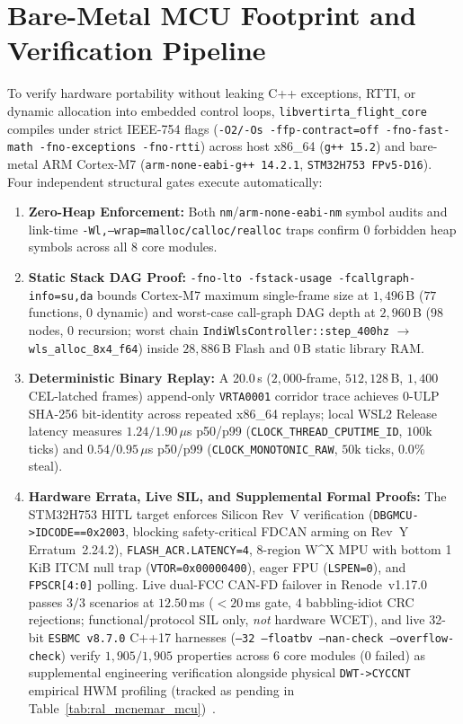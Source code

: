 \documentclass[letterpaper, 10 pt, journal, twoside]{IEEEtran}
\begin{document}
\section{Bare-Metal MCU Footprint and Verification Pipeline}
\label{sec:mcu_formal}

To verify hardware portability without leaking C++ exceptions, RTTI, or dynamic allocation into embedded control loops, \texttt{libvertirta\_flight\_core} compiles under strict IEEE-754 flags (\texttt{-O2/-Os -ffp-contract=off -fno-fast-math -fno-exceptions -fno-rtti}) across host x86\_64 (\texttt{g++ 15.2}) and bare-metal ARM Cortex-M7 (\texttt{arm-none-eabi-g++ 14.2.1}, \texttt{STM32H753 FPv5-D16}). Four independent structural gates execute automatically:
\begin{enumerate}
  \item \textbf{Zero-Heap Enforcement:} Both \texttt{nm}/\texttt{arm-none-eabi-nm} symbol audits and link-time \texttt{-Wl,--wrap=malloc/calloc/realloc} traps confirm $0$ forbidden heap symbols across all 8 core modules.
  \item \textbf{Static Stack DAG Proof:} \texttt{-fno-lto -fstack-usage -fcallgraph-info=su,da} bounds Cortex-M7 maximum single-frame size at $1{,}496$\,B ($77$ functions, $0$ dynamic) and worst-case call-graph DAG depth at $2{,}960$\,B ($98$ nodes, $0$ recursion; worst chain \texttt{IndiWlsController::step\_400hz} $\to$ \texttt{wls\_alloc\_8x4\_f64}) inside $28{,}886$\,B Flash and $0$\,B static library RAM.
  \item \textbf{Deterministic Binary Replay:} A 20.0\,s ($2{,}000$-frame, $512{,}128$\,B, $1{,}400$ CEL-latched frames) append-only \texttt{VRTA0001} corridor trace achieves 0-ULP SHA-256 bit-identity across repeated x86\_64 replays; local WSL2 Release latency measures $1.24/1.90\,\mu$s p50/p99 (\texttt{CLOCK\_THREAD\_CPUTIME\_ID}, $100\text{k}$ ticks) and $0.54/0.95\,\mu$s p50/p99 (\texttt{CLOCK\_MONOTONIC\_RAW}, $50\text{k}$ ticks, $0.0\%$ steal).
  \item \textbf{Hardware Errata, Live SIL, and Supplemental Formal Proofs:} The STM32H753 HITL target enforces Silicon Rev~V verification (\texttt{DBGMCU->IDCODE==0x2003}, blocking safety-critical FDCAN arming on Rev~Y Erratum~2.24.2), \texttt{FLASH\_ACR.LATENCY=4}, 8-region W\^{}X MPU with bottom 1\,KiB ITCM null trap (\texttt{VTOR=0x00000400}), eager FPU (\texttt{LSPEN=0}), and \texttt{FPSCR[4:0]} polling. Live dual-FCC CAN-FD failover in Renode~v1.17.0 passes $3/3$ scenarios at $12.50$\,ms ($<20$\,ms gate, $4$ babbling-idiot CRC rejections; functional/protocol SIL only, \emph{not} hardware WCET), and live 32-bit \texttt{ESBMC v8.7.0} C++17 harnesses (\texttt{--32 --floatbv --nan-check --overflow-check}) verify $1{,}905/1{,}905$ properties across $6$ core modules ($0$ failed) as supplemental engineering verification alongside physical \texttt{DWT->CYCCNT} empirical HWM profiling (tracked as pending in Table~\ref{tab:ral_mcnemar_mcu})~\cite{gadelha_esbmc_2018}.
\end{enumerate}
\end{document}
